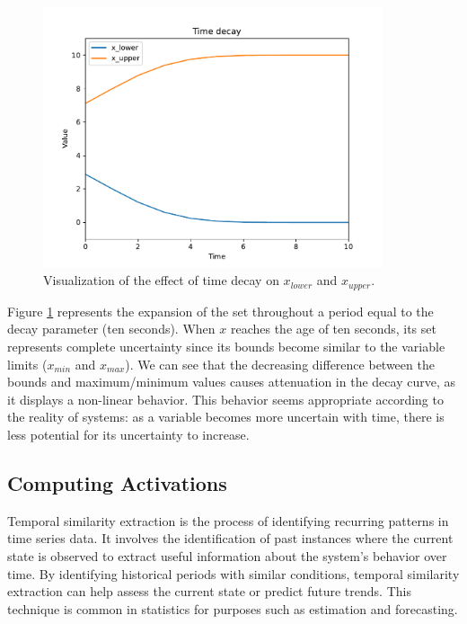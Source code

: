 \begin{figure}[h!]
    \centering
    \includegraphics[width=10cm]{figures/chapter4/cell/time_decay.pdf}
    \caption{Visualization of the effect of time decay on $x_{lower}$ and $x_{upper}$.}
    \label{fig:timedecay}
\end{figure}

Figure \ref{fig:timedecay} represents the expansion of the set throughout a period equal to the decay parameter (ten seconds). When $x$ reaches the age of ten seconds, its set represents complete uncertainty since its bounds become similar to the variable limits ($x_{min}$ and $x_{max}$). We can see that the decreasing difference between the bounds and maximum/minimum values causes attenuation in the decay curve, as it displays a non-linear behavior. This behavior seems appropriate according to the reality of systems: as a variable becomes more uncertain with time, there is less potential for its uncertainty to increase.


\subsection{Computing Activations} \label{subsec:tempsim}

Temporal similarity extraction is the process of identifying recurring patterns in time series data. It involves the identification of past instances where the current state is observed to extract useful information about the system's behavior over time. By identifying historical periods with similar conditions, temporal similarity extraction can help assess the current state or predict future trends. This technique is common in statistics for purposes such as estimation and forecasting.

